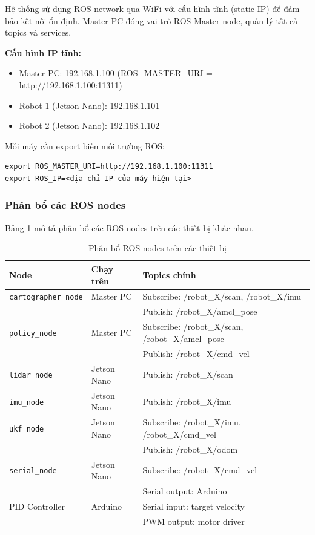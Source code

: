Hệ thống sử dụng ROS network qua WiFi với cấu hình tĩnh (static IP) để đảm bảo kết nối ổn định. Master PC đóng vai trò ROS Master node, quản lý tất cả topics và services.

\textbf{Cấu hình IP tĩnh:}
\begin{itemize}[nosep]
\item Master PC: 192.168.1.100 (ROS\_MASTER\_URI = http://192.168.1.100:11311)
\item Robot 1 (Jetson Nano): 192.168.1.101
\item Robot 2 (Jetson Nano): 192.168.1.102
\end{itemize}

Mỗi máy cần export biến môi trường ROS:
\begin{verbatim}
export ROS_MASTER_URI=http://192.168.1.100:11311
export ROS_IP=<địa chỉ IP của máy hiện tại>
\end{verbatim}

\subsubsection{Phân bổ các ROS nodes}

Bảng \ref{tab:node_distribution} mô tả phân bổ các ROS nodes trên các thiết bị khác nhau.

\begin{table}[H]
\centering
\caption{Phân bổ ROS nodes trên các thiết bị}
\label{tab:node_distribution}
\begin{tabular}{lll}
\hline
\textbf{Node} & \textbf{Chạy trên} & \textbf{Topics chính} \\
\hline
\texttt{cartographer\_node} & Master PC & Subscribe: /robot\_X/scan, /robot\_X/imu \\
                            &           & Publish: /robot\_X/amcl\_pose \\
\hline
\texttt{policy\_node} & Master PC & Subscribe: /robot\_X/scan, /robot\_X/amcl\_pose \\
                      &           & Publish: /robot\_X/cmd\_vel \\
\hline
\texttt{lidar\_node} & Jetson Nano & Publish: /robot\_X/scan \\
\hline
\texttt{imu\_node} & Jetson Nano & Publish: /robot\_X/imu \\
\hline
\texttt{ukf\_node} & Jetson Nano & Subscribe: /robot\_X/imu, /robot\_X/cmd\_vel \\
                   &             & Publish: /robot\_X/odom \\
\hline
\texttt{serial\_node} & Jetson Nano & Subscribe: /robot\_X/cmd\_vel \\
                      &             & Serial output: Arduino \\
\hline
PID Controller & Arduino & Serial input: target velocity \\
               &         & PWM output: motor driver \\
\hline
\end{tabular}
\end{table}

